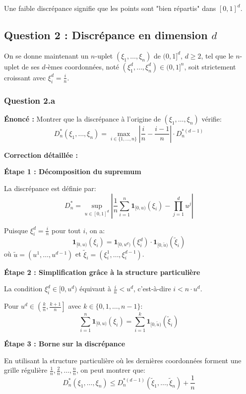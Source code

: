\documentclass[12pt,a4paper]{article}
\theoremstyle{definition}
\newcommand{\ind}{\mathbf{1}}
\begin{document}
Une faible discrépance signifie que les points sont "bien répartis" dans $[0,1]^d$.

\subsection{Question 2 : Discrépance en dimension $d$}

On se donne maintenant un $n$-uplet $(\xi_1, \ldots, \xi_n)$ de $(0,1]^d$, $d \geq 2$, tel que le $n$-uplet de ses $d$-èmes coordonnées, noté $(\xi_1^d, \ldots, \xi_n^d) \in (0,1]^n$, soit strictement croissant avec $\xi_i^d = \frac{i}{n}$.

\subsubsection{Question 2.a}

\textbf{Énoncé :} Montrer que la discrépance à l'origine de $(\xi_1, \ldots, \xi_n)$ vérifie:
\[
D_n^*(\xi_1, \ldots, \xi_n) = \max_{i \in \{1,\ldots,n\}} \left| \frac{i}{n} - \frac{i-1}{n} \right| \cdot D_{n}^{*(d-1)}
\]

\textbf{Correction détaillée :}

\textbf{Étape 1 : Décomposition du supremum}

La discrépance est définie par:
\[
D_n^* = \sup_{u \in [0,1]^d} \left| \frac{1}{n} \sum_{i=1}^{n} \ind_{[0,u)}(\xi_i) - \prod_{j=1}^{d} u^j \right|
\]

Puisque $\xi_i^d = \frac{i}{n}$ pour tout $i$, on a:
\[
\ind_{[0,u)}(\xi_i) = \ind_{[0,u^d)}(\xi_i^d) \cdot \ind_{[0,\tilde{u})}(\tilde{\xi}_i)
\]
où $\tilde{u} = (u^1, \ldots, u^{d-1})$ et $\tilde{\xi}_i = (\xi_i^1, \ldots, \xi_i^{d-1})$.

\textbf{Étape 2 : Simplification grâce à la structure particulière}

La condition $\xi_i^d \in [0, u^d)$ équivaut à $\frac{i}{n} < u^d$, c'est-à-dire $i < n \cdot u^d$.

Pour $u^d \in \left(\frac{k}{n}, \frac{k+1}{n}\right]$ avec $k \in \{0, 1, \ldots, n-1\}$:
\[
\sum_{i=1}^{n} \ind_{[0,u)}(\xi_i) = \sum_{i=1}^{k} \ind_{[0,\tilde{u})}(\tilde{\xi}_i)
\]

\textbf{Étape 3 : Borne sur la discrépance}

En utilisant la structure particulière où les dernières coordonnées forment une grille régulière $\frac{1}{n}, \frac{2}{n}, \ldots, \frac{n}{n}$, on peut montrer que:
\[
D_n^*(\xi_1, \ldots, \xi_n) \leq D_{n}^{*(d-1)}(\tilde{\xi}_1, \ldots, \tilde{\xi}_n) + \frac{1}{n}
\]
\end{document}
